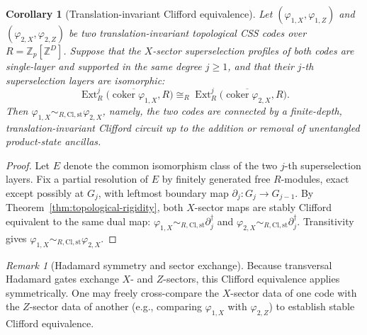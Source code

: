 \documentclass[aps,prx,english,superscriptaddress,twocolumn,tightenlines,showpacs,longbibliography,floatfix,amsfonts]{revtex4-2}
\newtheorem{corollary}{Corollary}
\theoremstyle{remark}
\newtheorem{remark}{Remark}
\theoremstyle{definition}
\begin{document}
\begin{corollary}[Translation-invariant Clifford equivalence]
    \label{cor:clifford-equivalence-isolated}
    Let \((\varphi_{1,X},\varphi_{1,Z})\) and \((\varphi_{2,X},\varphi_{2,Z})\) be two translation-invariant topological CSS codes over $R=\mathbb{Z}_p[\mathbb{Z}^D]$. Suppose that the \(X\)-sector superselection profiles of both codes are single-layer and supported in the same degree $j\ge 1$, and that their \(j\)-th superselection layers are isomorphic:
    \begin{equation}
        \operatorname{Ext}_R^j\!\bigl(\overline{\operatorname{coker}\varphi_{1,X}}, R\bigr)
        \cong_R
        \operatorname{Ext}_R^j\!\bigl(\overline{\operatorname{coker}\varphi_{2,X}}, R\bigr).
    \end{equation}
    Then $\varphi_{1,X}\sim_{R,\mathrm{Cl},\mathrm{st}}\varphi_{2,X}$, namely, the two codes are connected by a finite-depth, translation-invariant Clifford circuit up to the addition or removal of unentangled product-state ancillas.
\end{corollary}

\begin{proof}
    Let \(E\) denote the common isomorphism class of the two \(j\)-th
    superselection layers. Fix a partial resolution of \(E\) by finitely generated free
    \(R\)-modules, exact except possibly at \(G_j\), with leftmost boundary
    map \(\partial_j\colon G_j\to G_{j-1}\). By
    Theorem~\ref{thm:topological-rigidity}, both \(X\)-sector maps are stably
    Clifford equivalent to the same dual map:
    \(\varphi_{1,X}\sim_{R,\mathrm{Cl},\mathrm{st}}\partial_j^\dagger\) and
    \(\varphi_{2,X}\sim_{R,\mathrm{Cl},\mathrm{st}}\partial_j^\dagger\). Transitivity
    gives
    \(\varphi_{1,X}\sim_{R,\mathrm{Cl},\mathrm{st}}\varphi_{2,X}\).
\end{proof}

\begin{remark}[Hadamard symmetry and sector exchange]
    Because transversal Hadamard gates exchange $X$- and $Z$-sectors, this Clifford equivalence applies symmetrically. One may freely cross-compare the $X$-sector data of one code with the $Z$-sector data of another (e.g., comparing $\varphi_{1,X}$ with $\varphi_{2,Z}$) to establish stable Clifford equivalence.
\end{remark}
\end{document}
